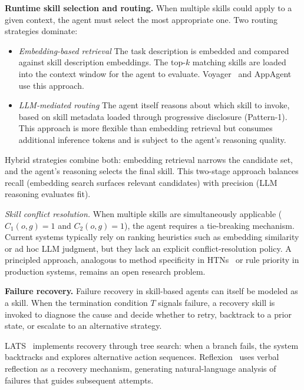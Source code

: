 \documentclass[conference, compsoc]{IEEEtran}
\theoremstyle{plain}
\newcommand{\para}[1]{\smallskip\noindent\textbf{#1.}}
\begin{document}
\para{Runtime skill selection and routing}\label{sec:composition:routing}
When multiple skills could apply to a given context, the agent must select the most appropriate one. Two routing strategies dominate:
\begin{itemize}
    \item \textit{Embedding-based retrieval} The task description is embedded and compared against skill description embeddings. The top-$k$ matching skills are loaded into the context window for the agent to evaluate. Voyager~\cite{wang2023voyager} and AppAgent~\cite{zhang2023appagent} use this approach.

    \item \textit{LLM-mediated routing} The agent itself reasons about which skill to invoke, based on skill metadata loaded through progressive disclosure (Pattern-1). This approach is more flexible than embedding retrieval but consumes additional inference tokens and is subject to the agent's reasoning quality.

\end{itemize}

Hybrid strategies combine both: embedding retrieval narrows the candidate set, and the agent's reasoning selects the final skill. This two-stage approach balances recall (embedding search surfaces relevant candidates) with precision (LLM reasoning evaluates fit).

\textit{Skill conflict resolution.}
When multiple skills are simultaneously applicable ($C_1(o,g)=1$ and $C_2(o,g)=1$), the agent requires a tie-breaking mechanism. Current systems typically rely on ranking heuristics such as embedding similarity or ad hoc LLM judgment, but they lack an explicit conflict-resolution policy. A principled approach, analogous to method specificity in HTNs~\cite{nau2003shop2} or rule priority in production systems, remains an open research problem.

\para{Failure recovery}\label{sec:composition:failure} Failure recovery in skill-based agents can itself be modeled as a skill. When the termination condition $T$ signals failure, a recovery skill is invoked to diagnose the cause and decide whether to retry, backtrack to a prior state, or escalate to an alternative strategy.

LATS~\cite{zhou2023lats} implements recovery through tree search: when a branch fails, the system backtracks and explores alternative action sequences. Reflexion~\cite{shinn2023reflexion} uses verbal reflection as a recovery mechanism, generating natural-language analysis of failures that guides subsequent attempts.
\end{document}
